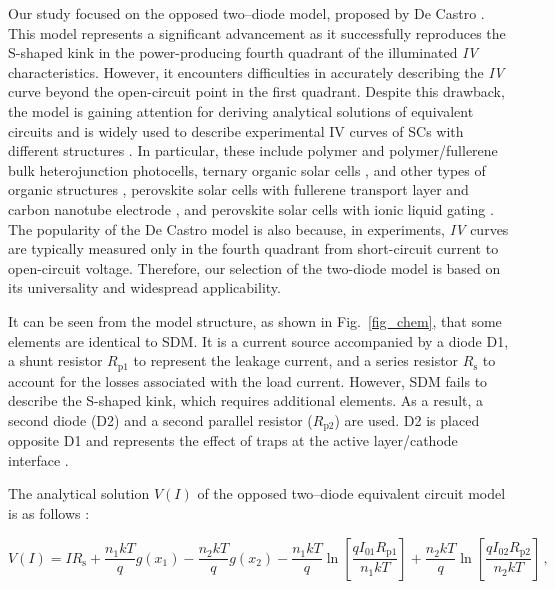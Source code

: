 \documentclass[a4paper,fleqn]{cas-sc}
\begin{document}
Our study focused on the opposed two--diode model, proposed by De Castro \cite{Castro2010}.
This model represents a significant advancement
as it successfully reproduces the S-shaped kink in the power-producing fourth quadrant
of the illuminated \emph{IV} characteristics.
However, it encounters difficulties in accurately describing the \emph{IV} curve beyond the open-circuit point in the first quadrant.
Despite this drawback, the model is gaining attention for deriving analytical solutions
of equivalent circuits \cite{Yu2019a}
and is widely used to describe experimental IV curves of SCs with different structures
\cite{CastroUseBook,Pillai2017,Arredondo2018,delPozo2012,BrenesBadilla2018,Tada2015Organic,Makha2018,CastroUsePerovskitIonikLiquid,CastroUsePerovskitFullerene}.
In particular, these include polymer \cite{Tada2015Organic}
and polymer/fullerene \cite{delPozo2012} bulk heterojunction photocells,
ternary organic solar cells \cite{Makha2018},
and other types of organic structures \cite{Pillai2017,Arredondo2018},
perovskite solar cells with fullerene transport layer and carbon nanotube electrode \cite{CastroUsePerovskitFullerene},
and perovskite solar cells with ionic liquid gating \cite{CastroUsePerovskitIonikLiquid}.
The popularity of the De Castro model is also because, in experiments,
\emph{IV} curves are typically measured only in the fourth quadrant from short-circuit current to open-circuit voltage.
Therefore, our selection of the two-diode model is based on its universality and widespread applicability.

It can be seen from the model structure, as shown in Fig.~\ref{fig_chem}, that some elements are identical to SDM.
It is a current source accompanied by a diode D1, a shunt resistor $R_\mathrm{p1}$ to represent the leakage current,
and a series resistor $R_\mathrm{s}$ to account for the losses associated with the load current.
However, SDM fails to describe the S-shaped kink, which requires additional elements.
As a result, a second diode  (D2) and a second parallel resistor ($R_\mathrm{p2}$) are used.
D2 is placed opposite D1 and represents the effect of traps at the active layer/cathode interface \cite{Castro2010}.

The analytical solution $V(I)$ of the opposed two--diode equivalent circuit model
is as follows \cite{CastroSolution,roberts2015calculating}:

\begin{equation}
\label{eqIV_g}
V(I)= IR_\mathrm{s}+\frac{n_1kT}{q}g(x_1)-\frac{n_2kT}{q}g(x_2)
  -\frac{n_1kT}{q}\ln\left[\frac{qI_{01}R_\mathrm{p1}}{n_1kT}\right] +\frac{n_2kT}{q}\ln\left[\frac{qI_{02}R_\mathrm{p2}}{n_2kT}\right]\,,
\end{equation}
\end{document}

